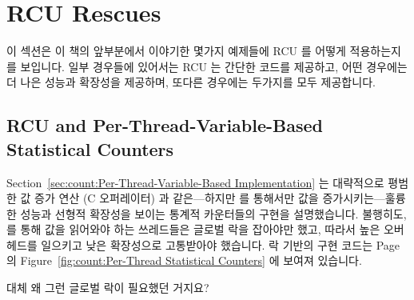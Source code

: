 
\section{RCU Rescues}
\label{sec:together:RCU Rescues}

이 섹션은 이 책의 앞부분에서 이야기한 몇가지 예제들에 RCU 를 어떻게
적용하는지를 보입니다.
일부 경우들에 있어서는 RCU 는 간단한 코드를 제공하고, 어떤 경우에는 더 나은
성능과 확장성을 제공하며, 또다른 경우에는 두가지를 모두 제공합니다.
\iffalse

This section shows how to apply RCU to some examples discussed earlier
in this book.
In some cases, RCU provides simpler code, in other cases better
performance and scalability, and in still other cases, both.
\fi

\subsection{RCU and Per-Thread-Variable-Based Statistical Counters}
\label{sec:together:RCU and Per-Thread-Variable-Based Statistical Counters}

Section~\ref{sec:count:Per-Thread-Variable-Based Implementation}
는 대략적으로 평범한 값 증가 연산 (C \co{++} 오퍼레이터) 과 같은---하지만
를 통해서만 값을 증가시키는---훌륭한 성능과 선형적 확장성을
보이는 통계적 카운터들의 구현을 설명했습니다.
불행히도,  를 통해 값을 읽어와야 하는 쓰레드들은 글로벌 락을 잡아야만 했고, 따라서 높은 오버헤드를 일으키고 낮은 확장성으로 고통받아야 했습니다.
락 기반의 구현 코드는
Page~\pageref{fig:count:Per-Thread Statistical Counters} 의
Figure~\ref{fig:count:Per-Thread Statistical Counters} 에 보여져 있습니다.
\iffalse

Section~\ref{sec:count:Per-Thread-Variable-Based Implementation}
described an implementation of statistical counters that provided
excellent
performance, roughly that of simple increment (as in the C \co{++}
operator), and linear scalability---but only for incrementing
via \co{inc_count()}.
Unfortunately, threads needing to read out the value via \co{read_count()}
were required to acquire a global
lock, and thus incurred high overhead and suffered poor scalability.
The code for the lock-based implementation is shown in
Figure~\ref{fig:count:Per-Thread Statistical Counters} on
Page~\pageref{fig:count:Per-Thread Statistical Counters}.
\fi

\QuickQuiz{}
	대체 왜 그런 글로벌 락이 필요했던 거지요?
	\iffalse

